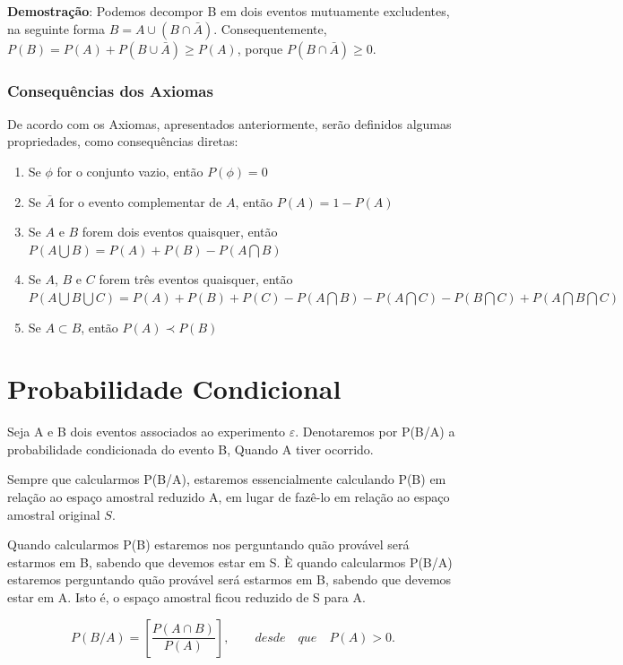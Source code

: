 \textbf{Demostração}: Podemos decompor B em dois eventos
mutuamente excludentes, na seguinte forma $B = A \cup (B \cap
\bar{A})$. Consequentemente, $P(B) = P(A)+ P(B \cup \bar{A}) \geq
P(A)$, porque $P(B \cap \bar{A}) \geq 0$.


\subsubsection{Consequências dos Axiomas}

\inic De acordo com os Axiomas, apresentados anteriormente, serão definidos algumas propriedades, como consequências diretas:

\begin{enumerate}
\item Se $\phi$ for o conjunto vazio, então $P(\phi)=0$
\item Se $\bar{A}$ for o evento complementar de $A$, então $P(A)=1-P(A)$
\item Se $A$ e $B$ forem dois eventos quaisquer, então $P(A \bigcup B)= P(A)+P(B)-P(A \bigcap B)$ 
\item Se $A$, $B$ e $C$ forem três eventos quaisquer, então $P(A \bigcup B \bigcup C)= P(A)+P(B)+P(C)- P(A \bigcap B)- P(A \bigcap C)- P(B \bigcap C)+P(A \bigcap B \bigcap C)$
\item Se $A \subset B$, então $P(A) \prec P(B)$
\end{enumerate}



\section{Probabilidade Condicional}

Seja A e B dois eventos associados ao experimento $\varepsilon$.
Denotaremos por P(B/A) a probabilidade condicionada do evento B,
Quando A tiver ocorrido.\vskip0.3cm

Sempre que calcularmos P(B/A), estaremos essencialmente calculando
P(B) em relação ao espaço amostral reduzido A, em lugar de fazê-lo
em relação ao espaço amostral original $S$.\vskip0.3cm

Quando calcularmos P(B) estaremos nos perguntando quão provável
será estarmos em B, sabendo que devemos estar em S. È quando
calcularmos P(B/A) estaremos perguntando quão provável será
estarmos em B, sabendo que devemos estar em A. Isto é, o espaço
amostral ficou reduzido de S para A.



\begin{equation}\label{}
    P(B/A) = \left[ \frac{P(A \cap B)}{P(A)} \right], \quad \quad desde \quad que
    \quad P(A)>0.
\end{equation}

